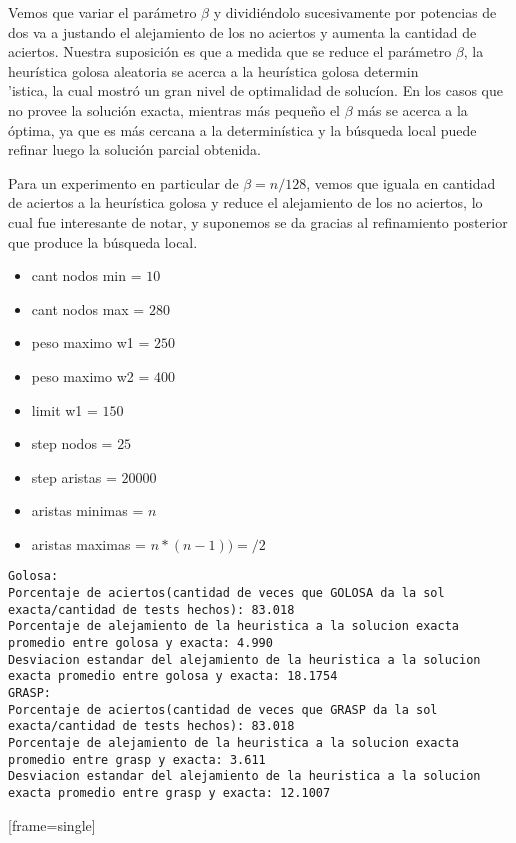 Vemos que variar el par\'ametro $\beta$ y dividi\'endolo sucesivamente por potencias de dos va a justando el alejamiento de los no aciertos y aumenta la cantidad de aciertos. Nuestra suposici\'on es que a medida que se reduce el par\'ametro $\beta$, la heur\'istica golosa aleatoria se acerca a la heur\'istica golosa determin\\'istica, la cual mostr\'o un gran nivel de optimalidad de soluc\'ion. En los casos que no provee la soluci\'on exacta, mientras m\'as pequeño el $\beta$ m\'as se acerca a la \'optima, ya que es m\'as cercana a la determin\'istica y la b\'usqueda local puede refinar luego la soluci\'on parcial obtenida.
\vspace{2mm}


Para un experimento en particular de $\beta = n/128$, vemos que iguala en cantidad de aciertos a la heur\'istica golosa y reduce el alejamiento de los no aciertos, lo cual fue interesante de notar, y suponemos se da gracias al refinamiento posterior que produce la b\'usqueda local.
\begin{itemize}
	\item cant nodos min = $10$
	\item cant nodos max = $280$
	\item peso maximo w1 = $250$
	\item peso maximo w2 = $400$
	\item limit w1 = $150$
	\item step nodos = $25$
	\item step aristas = $20000$
	\item aristas minimas = $n$
	\item aristas maximas = $n * (n-1))=/2$
\end{itemize}


\begin{lstlisting}[frame=single]
Golosa:
Porcentaje de aciertos(cantidad de veces que GOLOSA da la sol exacta/cantidad de tests hechos): 83.018
Porcentaje de alejamiento de la heuristica a la solucion exacta promedio entre golosa y exacta: 4.990
Desviacion estandar del alejamiento de la heuristica a la solucion exacta promedio entre golosa y exacta: 18.1754
GRASP:
Porcentaje de aciertos(cantidad de veces que GRASP da la sol exacta/cantidad de tests hechos): 83.018
Porcentaje de alejamiento de la heuristica a la solucion exacta promedio entre grasp y exacta: 3.611
Desviacion estandar del alejamiento de la heuristica a la solucion exacta promedio entre grasp y exacta: 12.1007
\end{lstlisting}[frame=single]

